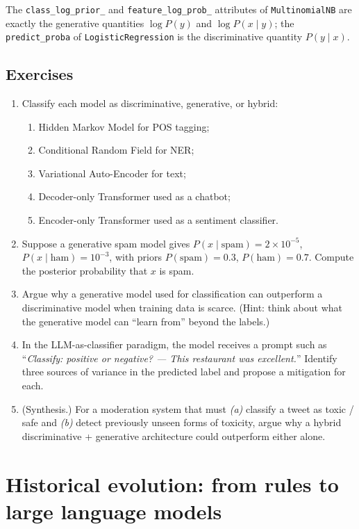 The \texttt{class\_log\_prior\_} and \texttt{feature\_log\_prob\_} attributes of \texttt{MultinomialNB} are exactly the generative quantities $\log P(y)$ and $\log P(x \mid y)$; the \texttt{predict\_proba} of \texttt{LogisticRegression} is the discriminative quantity $P(y \mid x)$.

\subsection{Exercises}
\begin{enumerate}
    \item Classify each model as discriminative, generative, or hybrid:
    \begin{enumerate}
        \item Hidden Markov Model for POS tagging;
        \item Conditional Random Field for NER;
        \item Variational Auto-Encoder for text;
        \item Decoder-only Transformer used as a chatbot;
        \item Encoder-only Transformer used as a sentiment classifier.
    \end{enumerate}
    \item Suppose a generative spam model gives $P(x \mid \text{spam}) = 2 \times 10^{-5}$, $P(x \mid \text{ham}) = 10^{-3}$, with priors $P(\text{spam}) = 0.3$, $P(\text{ham}) = 0.7$. Compute the posterior probability that $x$ is spam.
    \item Argue why a generative model used for classification can outperform a discriminative model when training data is scarce. (Hint: think about what the generative model can ``learn from'' beyond the labels.)
    \item In the LLM-as-classifier paradigm, the model receives a prompt such as ``\emph{Classify: positive or negative? --- This restaurant was excellent.}'' Identify three sources of variance in the predicted label and propose a mitigation for each.
    \item (Synthesis.) For a moderation system that must \emph{(a)} classify a tweet as toxic / safe and \emph{(b)} detect previously unseen forms of toxicity, argue why a hybrid discriminative + generative architecture could outperform either alone.
\end{enumerate}

\section{Historical evolution: from rules to large language models}
\label{sec:history}

